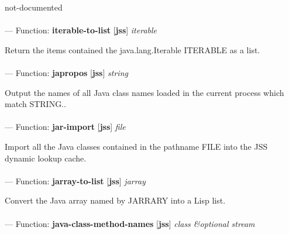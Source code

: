 \begin{adjustwidth}{5em}{5em}
not-documented
\end{adjustwidth}

\paragraph{}
\label{JSS:ITERABLE-TO-LIST}
--- Function: \textbf{iterable-to-list} [\textbf{jss}] \textit{iterable}

\begin{adjustwidth}{5em}{5em}
Return the items contained the java.lang.Iterable ITERABLE as a list.
\end{adjustwidth}

\paragraph{}
\label{JSS:JAPROPOS}
--- Function: \textbf{japropos} [\textbf{jss}] \textit{string}

\begin{adjustwidth}{5em}{5em}
Output the names of all Java class names loaded in the current process which match STRING..
\end{adjustwidth}

\paragraph{}
\label{JSS:JAR-IMPORT}
--- Function: \textbf{jar-import} [\textbf{jss}] \textit{file}

\begin{adjustwidth}{5em}{5em}
Import all the Java classes contained in the pathname FILE into the JSS dynamic lookup cache.
\end{adjustwidth}

\paragraph{}
\label{JSS:JARRAY-TO-LIST}
--- Function: \textbf{jarray-to-list} [\textbf{jss}] \textit{jarray}

\begin{adjustwidth}{5em}{5em}
Convert the Java array named by JARRARY into a Lisp list.
\end{adjustwidth}

\paragraph{}
\label{JSS:JAVA-CLASS-METHOD-NAMES}
--- Function: \textbf{java-class-method-names} [\textbf{jss}] \textit{class \&optional stream}

